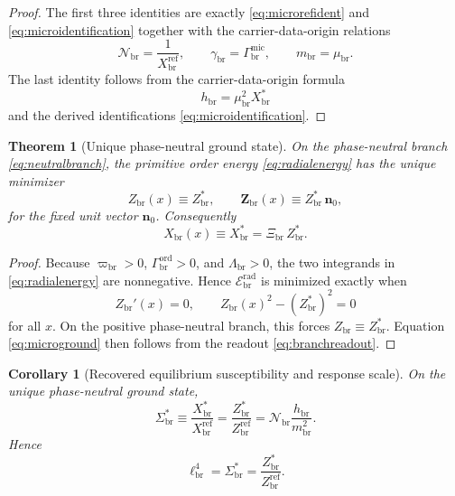\documentclass[11pt]{article}
\newcommand{\CurvScale}{\ell_{\mathrm{br}}}
\newcommand{\ProfWeight}{\varpi_{\mathrm{br}}}
\newcommand{\RespSusEq}{\Sigma_{\mathrm{br}}^{\ast}}
\newcommand{\RespNorm}{\mathcal N_{\mathrm{br}}}
\newcommand{\RespFluxCoeff}{\gamma_{\mathrm{br}}}
\newcommand{\RespGap}{m_{\mathrm{br}}}
\newcommand{\RespBias}{h_{\mathrm{br}}}
\newcommand{\RespMicro}{X_{\mathrm{br}}}
\newcommand{\RespMicroEq}{X_{\mathrm{br}}^{\ast}}
\newcommand{\RespMicroRef}{X_{\mathrm{br}}^{\mathrm{ref}}}
\newcommand{\RespMicroFluxCoeff}{\Gamma_{\mathrm{br}}^{\mathrm{mic}}}
\newcommand{\RespMicroGap}{\mu_{\mathrm{br}}}
\newcommand{\RespOrderField}{\bm Z_{\mathrm{br}}}
\newcommand{\RespOrderAmp}{Z_{\mathrm{br}}}
\newcommand{\RespOrderRef}{Z_{\mathrm{br}}^{\mathrm{ref}}}
\newcommand{\RespOrderEq}{Z_{\mathrm{br}}^{\ast}}
\newcommand{\RespOrderReadout}{\Xi_{\mathrm{br}}}
\newcommand{\RespOrderStiff}{\Gamma_{\mathrm{br}}^{\mathrm{ord}}}
\newcommand{\RespOrderQuartic}{\Lambda_{\mathrm{br}}}
\newcommand{\RespOrderRadEnergy}{\mathscr E_{\mathrm{br}}^{\mathrm{rad}}}
\newcommand{\RespOrderDir}{\bm n_0}
\newtheorem{corollary}{Corollary}
\newtheorem{theorem}{Theorem}
\begin{document}
\begin{proof}
The first three identities are exactly \eqref{eq:microrefident} and \eqref{eq:microidentification} together with the carrier-data-origin relations
\[
\RespNorm=\frac{1}{\RespMicroRef},
\qquad
\RespFluxCoeff=\RespMicroFluxCoeff,
\qquad
\RespGap=\RespMicroGap.
\]
The last identity follows from the carrier-data-origin formula
\[
\RespBias=\RespMicroGap^2\RespMicroEq
\]
and the derived identifications \eqref{eq:microidentification}.
\end{proof}

\begin{theorem}[Unique phase-neutral ground state]
\label{thm:ground}
On the phase-neutral branch \eqref{eq:neutralbranch}, the primitive order energy \eqref{eq:radialenergy} has the unique minimizer
\begin{equation}
\RespOrderAmp(x)\equiv\RespOrderEq,
\qquad
\RespOrderField(x)\equiv \RespOrderEq\,\RespOrderDir,
\label{eq:orderground}
\end{equation}
for the fixed unit vector \(\RespOrderDir\). Consequently
\begin{equation}
\RespMicro(x)\equiv\RespMicroEq=\RespOrderReadout\,\RespOrderEq.
\label{eq:microground}
\end{equation}
\end{theorem}

\begin{proof}
Because \(\ProfWeight>0\), \(\RespOrderStiff>0\), and \(\RespOrderQuartic>0\), the two integrands in \eqref{eq:radialenergy} are nonnegative. Hence \(\RespOrderRadEnergy\) is minimized exactly when
\[
\RespOrderAmp'(x)=0,
\qquad
\RespOrderAmp(x)^2-(\RespOrderEq)^2=0
\]
for all \(x\). On the positive phase-neutral branch, this forces \(\RespOrderAmp\equiv\RespOrderEq\). Equation \eqref{eq:microground} then follows from the readout \eqref{eq:branchreadout}.
\end{proof}

\begin{corollary}[Recovered equilibrium susceptibility and response scale]
\label{cor:sigmaeq}
On the unique phase-neutral ground state,
\begin{equation}
\RespSusEq
\equiv
\frac{\RespMicroEq}{\RespMicroRef}
=
\frac{\RespOrderEq}{\RespOrderRef}
=
\RespNorm\frac{\RespBias}{\RespGap^2}.
\label{eq:sigmaeq}
\end{equation}
Hence
\begin{equation}
\CurvScale^4=\RespSusEq=\frac{\RespOrderEq}{\RespOrderRef}.
\label{eq:scaleeq}
\end{equation}
\end{corollary}
\end{document}
